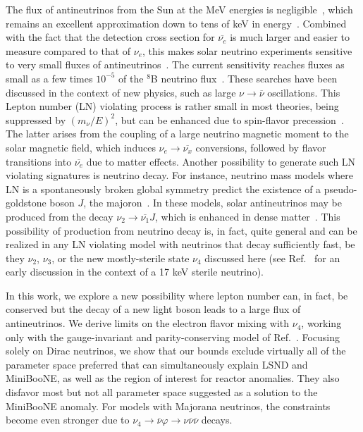 \documentclass[
reprint,
superscriptaddress,
showpacs,
preprintnumbers,
nofootinbib,
nobibnotes,
amsmath,
amssymb, 
aps,
prd,
floatfix
]{revtex4-1}
\renewcommand{\phi}{\varphi}
\begin{document}
The flux of antineutrinos from the Sun at the MeV energies is negligible~\cite{Malaney:1989hs}, which remains an excellent approximation down to tens of keV in energy~\cite{Vitagliano:2017odj}. Combined with the fact that the detection cross section for $\overline{\nu_e}$ is much larger and easier to measure compared to that of $\nu_e$, this makes solar neutrino experiments sensitive to very small fluxes of antineutrinos~\cite{Akhmedov:1991uk,Barbieri:1991ed,Acker:1992eh}. The current sensitivity reaches fluxes as small as a few times $10^{-5}$ of the $^8$B neutrino flux~\cite{Aharmim:2004uf,Collaboration:2011jza,Agostini:2019yuq,Linyan2018,Super-Kamiokande:2020frs,Abe:2021tkw}. These searches have been discussed in the context of new physics, such as large $\nu\to\overline{\nu}$ oscillations. This Lepton number (LN) violating process is rather small in most theories, being suppressed by $(m_\nu/E)^2$, but can be enhanced due to spin-flavor precession~\cite{Lim:1987tk,Akhmedov:1989df}. The latter arises from the coupling of a large neutrino magnetic moment to the solar magnetic field, which induces $\nu_e \to \overline{\nu_x}$ conversions, followed by flavor transitions into $\overline{\nu_e}$ due to matter effects. Another possibility to generate such LN violating signatures is neutrino decay. For instance, neutrino mass models where LN is a spontaneously broken global symmetry predict the existence of a pseudo-goldstone boson $J$, the majoron~\cite{Chikashige:1980ui,Gelmini:1980re}. In these models, solar antineutrinos may be produced from the decay $\nu_2 \to \overline{\nu_1} J$, which is enhanced in dense matter~\cite{Berezhiani:1987gf}. This possibility of production from neutrino decay is, in fact, quite general and can be realized in any LN violating model with neutrinos that decay sufficiently fast, be they $\nu_2$, $\nu_3$, or the new mostly-sterile state $\nu_4$ discussed here (see Ref.~\cite{Berezhiani:1991vk} for an early discussion in the context of a 17 keV sterile neutrino). 

In this work, we explore a new possibility where lepton number can, in fact, be conserved but the decay of a new light boson leads to a large flux of antineutrinos. We derive limits on the electron flavor mixing with $\nu_4$, working only with the gauge-invariant and parity-conserving model of Ref.~\cite{Dentler:2019dhz}. Focusing solely on Dirac neutrinos, we show that our bounds exclude virtually all of the parameter space preferred that can simultaneously explain LSND and MiniBooNE, as well as the region of interest for reactor anomalies. 
They also disfavor most but not all parameter space suggested as a solution to the MiniBooNE anomaly. For models with Majorana neutrinos, the constraints become even stronger due to $\nu_4 \to \overline{\nu} \phi \to \nu \overline{\nu} \overline{\nu}$ decays.
\end{document}
